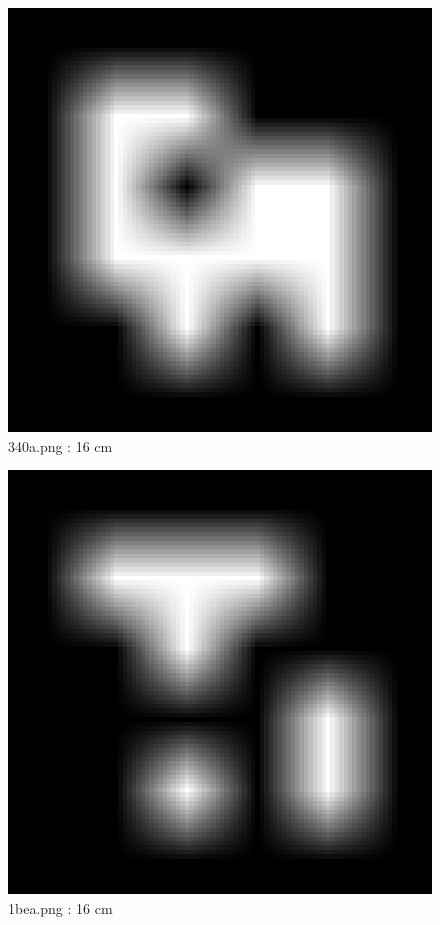 \documentclass[11pt,a4,BCOR=0cm]{scrartcl}
\begin{document}
\begin{figure}
  \begin{center}
    \includegraphics[natwidth=6,natheight=6,width=16cm]{340a.png}
    \caption{340a.png : 16 cm}
    \label{fig:340a.png}
  \end{center}
\end{figure}
\newpage
\begin{figure}
  \begin{center}
    \includegraphics[natwidth=6,natheight=6,width=16cm]{1bea.png}
    \caption{1bea.png : 16 cm}
    \label{fig:1bea.png}
  \end{center}
\end{figure}
\end{document}

